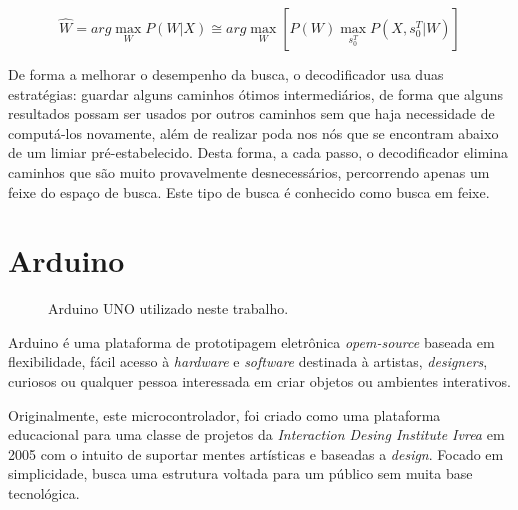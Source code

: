 \documentclass[12pt,a4paper,oneside]{report}
\begin{document}
\begin{equation}
\widehat{W} = arg \max _{W} P(W|X) \cong arg \max _{W} [P(W) \max _{s_{0}^{T}} P(X,s_{0}^{T}|W)]
\label{equ:viterbi}
\end{equation}

De forma a melhorar o desempenho da busca, o decodificador usa duas estratégias: guardar alguns caminhos ótimos intermediários, de forma que alguns resultados possam ser usados por outros caminhos sem que haja necessidade de computá-los novamente, além de realizar poda nos nós que se encontram abaixo de um limiar pré-estabelecido. Desta forma, a cada passo, o decodificador elimina caminhos que são muito provavelmente desnecessários, percorrendo apenas um feixe do espaço de busca. Este tipo de busca é conhecido como busca em feixe.

\section{Arduino}

\begin{figure}[h!]
\centering
{}\caption{Arduino UNO utilizado neste trabalho.}
\label{fig:arduino}
\end{figure}

Arduino \cite{arduino} é uma plataforma de prototipagem eletrônica \emph{opem-source} baseada em flexibilidade, fácil acesso à \emph{hardware} e \emph{software} destinada à artistas, \emph{designers}, curiosos ou qualquer pessoa interessada em criar objetos ou ambientes interativos.

Originalmente, este microcontrolador, foi criado como uma plataforma educacional para uma classe de projetos da \emph{Interaction Desing Institute Ivrea} em 2005 com o intuito de suportar mentes artísticas e baseadas a \emph{design}. Focado em simplicidade, busca uma estrutura voltada para um público sem muita base tecnológica.
\end{document}
